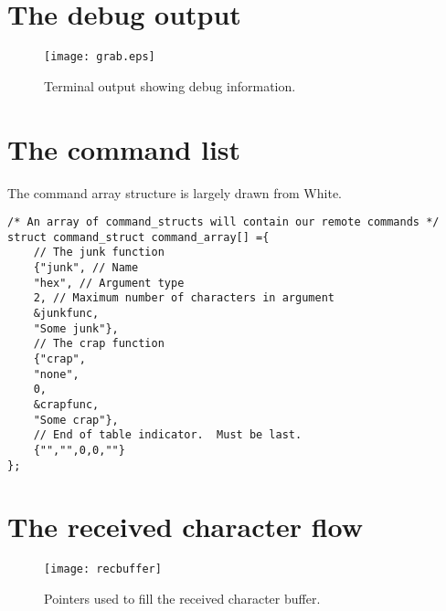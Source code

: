 \clearpage{}
\section{The debug output}

\begin{figure}[ht]
    \begin{center}
        \texttt{[image: grab.eps]}
        \caption{Terminal output showing debug information.\label{fig:termgrab}}
    \end{center}
\end{figure}




\clearpage{}
\section{The command list}
The command array structure is largely drawn from White\cite{bok:white2012}.

\lstset{language=C}
\begin{lstlisting}[float, % Allows this listing to be a latex float
                   frame=single,
                   caption={Defining the command set with an array of
                            command structures.},
                   label=lst:cmdarray
                  ]
/* An array of command_structs will contain our remote commands */
struct command_struct command_array[] ={
    // The junk function
    {"junk", // Name
    "hex", // Argument type
    2, // Maximum number of characters in argument
    &junkfunc,
    "Some junk"},
    // The crap function
    {"crap",
    "none",
    0,
    &crapfunc,
    "Some crap"},
    // End of table indicator.  Must be last.
    {"","",0,0,""}
};
\end{lstlisting}

\clearpage{}
\section{The received character flow}

\begin{figure}[ht]
    \begin{center}
        \texttt{[image: recbuffer]}
        \caption{Pointers used to fill the received character buffer.\label{fig:recbuffer}}
    \end{center}
\end{figure}



